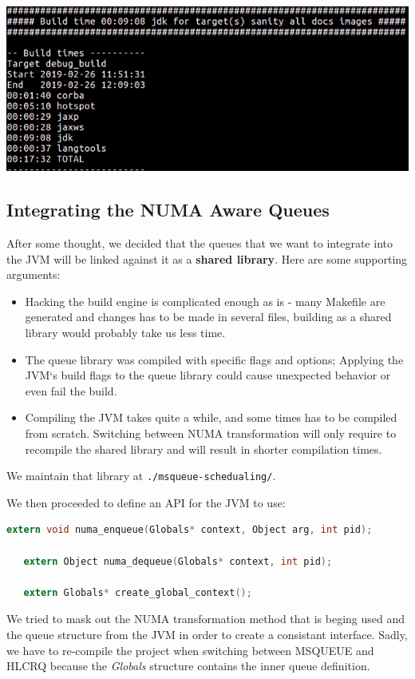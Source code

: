 \documentclass{article}
\begin{document}
 \includegraphics[width=\textwidth]{initial_build.png}

 \newpage

 \subsection{Integrating the NUMA Aware Queues} \label{queues:integration}
 After some thought, we decided that the queues that we want to integrate into the JVM will be linked against it as a \textbf{shared library}. Here are some supporting arguments:
 \begin{itemize}
   \item Hacking the build engine is complicated enough as is - many Makefile are generated and changes has to be made in several files, building as a shared library would probably take us less time.
   \item The queue library was compiled with specific flags and options; Applying the JVM`s build flags to the queue library could cause unexpected behavior or even fail the build.
   \item Compiling the JVM takes quite a while, and some times has to be compiled from scratch. Switching between NUMA transformation will only require to recompile the shared library and will result in shorter compilation times.
 \end{itemize}

 We maintain that library at \texttt{./msqueue-schedualing/}. 

 We then proceeded to define an API for the JVM to use:
 \begin{lstlisting}[language=C]
   extern void numa_enqueue(Globals* context, Object arg, int pid);

   extern Object numa_dequeue(Globals* context, int pid);
   
   extern Globals* create_global_context();
 \end{lstlisting}

 We tried to mask out the NUMA transformation method that is beging used and the queue structure from the JVM in order to create a consistant interface. Sadly, we have to re-compile the project when switching between MSQUEUE and HLCRQ because the \textit{Globals} structure contains the inner queue definition.
\end{document}
